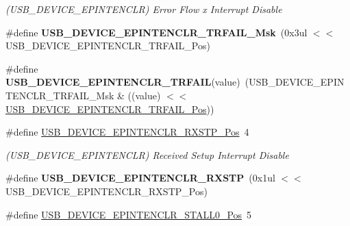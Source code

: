 \begin{DoxyCompactItemize}
\begin{DoxyCompactList}\small\item\em (U\+S\+B\+\_\+\+D\+E\+V\+I\+C\+E\+\_\+\+E\+P\+I\+N\+T\+E\+N\+C\+L\+R) Error Flow x Interrupt Disable \end{DoxyCompactList}\item 
\hypertarget{group___s_a_m_l21___u_s_b_ga7f849b480a715a0e12edb3a258e47fd5}{}\#define {\bfseries U\+S\+B\+\_\+\+D\+E\+V\+I\+C\+E\+\_\+\+E\+P\+I\+N\+T\+E\+N\+C\+L\+R\+\_\+\+T\+R\+F\+A\+I\+L\+\_\+\+Msk}~(0x3ul $<$$<$ U\+S\+B\+\_\+\+D\+E\+V\+I\+C\+E\+\_\+\+E\+P\+I\+N\+T\+E\+N\+C\+L\+R\+\_\+\+T\+R\+F\+A\+I\+L\+\_\+\+Pos)\label{group___s_a_m_l21___u_s_b_ga7f849b480a715a0e12edb3a258e47fd5}

\item 
\hypertarget{group___s_a_m_l21___u_s_b_gaf4d60e965d071984ad30b78b7af49c92}{}\#define {\bfseries U\+S\+B\+\_\+\+D\+E\+V\+I\+C\+E\+\_\+\+E\+P\+I\+N\+T\+E\+N\+C\+L\+R\+\_\+\+T\+R\+F\+A\+I\+L}(value)~(U\+S\+B\+\_\+\+D\+E\+V\+I\+C\+E\+\_\+\+E\+P\+I\+N\+T\+E\+N\+C\+L\+R\+\_\+\+T\+R\+F\+A\+I\+L\+\_\+\+Msk \& ((value) $<$$<$ \hyperlink{group___s_a_m_l21___u_s_b_gafe24801747027f37cd56d49ece4bab43}{U\+S\+B\+\_\+\+D\+E\+V\+I\+C\+E\+\_\+\+E\+P\+I\+N\+T\+E\+N\+C\+L\+R\+\_\+\+T\+R\+F\+A\+I\+L\+\_\+\+Pos}))\label{group___s_a_m_l21___u_s_b_gaf4d60e965d071984ad30b78b7af49c92}

\item 
\hypertarget{group___s_a_m_l21___u_s_b_ga717dd911f7368a946720488fc1e24f93}{}\#define \hyperlink{group___s_a_m_l21___u_s_b_ga717dd911f7368a946720488fc1e24f93}{U\+S\+B\+\_\+\+D\+E\+V\+I\+C\+E\+\_\+\+E\+P\+I\+N\+T\+E\+N\+C\+L\+R\+\_\+\+R\+X\+S\+T\+P\+\_\+\+Pos}~4\label{group___s_a_m_l21___u_s_b_ga717dd911f7368a946720488fc1e24f93}

\begin{DoxyCompactList}\small\item\em (U\+S\+B\+\_\+\+D\+E\+V\+I\+C\+E\+\_\+\+E\+P\+I\+N\+T\+E\+N\+C\+L\+R) Received Setup Interrupt Disable \end{DoxyCompactList}\item 
\hypertarget{group___s_a_m_l21___u_s_b_ga7d2d5be11fc1e2f69cebd2669400328c}{}\#define {\bfseries U\+S\+B\+\_\+\+D\+E\+V\+I\+C\+E\+\_\+\+E\+P\+I\+N\+T\+E\+N\+C\+L\+R\+\_\+\+R\+X\+S\+T\+P}~(0x1ul $<$$<$ U\+S\+B\+\_\+\+D\+E\+V\+I\+C\+E\+\_\+\+E\+P\+I\+N\+T\+E\+N\+C\+L\+R\+\_\+\+R\+X\+S\+T\+P\+\_\+\+Pos)\label{group___s_a_m_l21___u_s_b_ga7d2d5be11fc1e2f69cebd2669400328c}

\item 
\hypertarget{group___s_a_m_l21___u_s_b_ga6903cb46049f609160a165ef1c9565e3}{}\#define \hyperlink{group___s_a_m_l21___u_s_b_ga6903cb46049f609160a165ef1c9565e3}{U\+S\+B\+\_\+\+D\+E\+V\+I\+C\+E\+\_\+\+E\+P\+I\+N\+T\+E\+N\+C\+L\+R\+\_\+\+S\+T\+A\+L\+L0\+\_\+\+Pos}~5\label{group___s_a_m_l21___u_s_b_ga6903cb46049f609160a165ef1c9565e3}


\end{DoxyCompactItemize}
